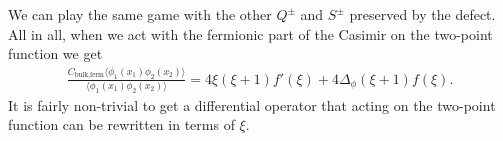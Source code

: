 \documentclass[letterpaper]{article}
\begin{document}
We can play the same game with the other $Q^\pm$ and $S^\pm$ preserved by the defect.
All in all, when we act with the fermionic part of the Casimir on the two-point function we get
\begin{align}
 \frac{C_{\text{bulk,ferm}}\langle \phi_1(x_1) \phi_2(x_2)\rangle}
      {\langle \phi_1(x_1) \phi_2(x_2)\rangle}
 = 
 4 \xi  (\xi +1) f'(\xi )+4 \Delta_\phi (\xi +1) f(\xi ).
\end{align}
It is fairly non-trivial to get a differential operator that acting on the two-point function can be rewritten in terms of $\xi$.
\end{document}
